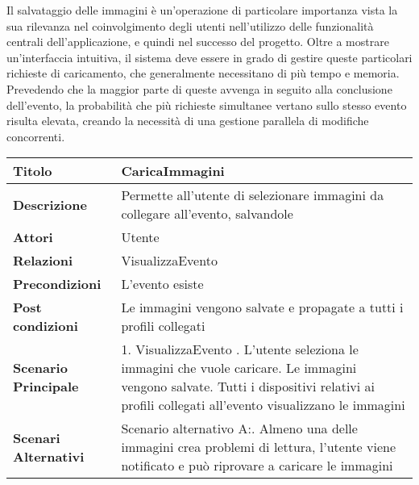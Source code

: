 Il salvataggio delle immagini è un'operazione di particolare importanza
vista la sua rilevanza nel coinvolgimento degli utenti
nell'utilizzo delle funzionalità centrali dell'applicazione,
e quindi nel successo del progetto.
Oltre a mostrare un'interfaccia intuitiva,
il sistema deve essere in grado di gestire queste particolari richieste di caricamento,
che generalmente necessitano di più tempo e memoria.
Prevedendo che la maggior parte di queste avvenga in seguito alla conclusione dell'evento,
la probabilità che più richieste simultanee vertano sullo stesso evento risulta elevata,
creando la necessità di una gestione parallela di modifiche concorrenti.\\

\begin{longtable} {|P{4.5cm}|P{11cm}|}
    \hline
    \textbf{Titolo}                   & CaricaImmagini                                                                  \\
    \hline
    \textbf{Descrizione}              & Permette all'utente di selezionare immagini da collegare all'evento, salvandole \\
    \hline
    \textbf{Attori}                   & Utente                                                                          \\
    \hline
    \textbf{Relazioni}                & VisualizzaEvento                                                                \\
    \hline
    \textbf{Precondizioni}            & L'evento esiste                                                                 \\
    \hline
    \textbf{Post condizioni}          & Le immagini vengono salvate e propagate a tutti i profili collegati             \\
    \hline
    \textbf{Scenario Principale}      & 1. VisualizzaEvento . L'utente seleziona le immagini che vuole caricare. Le immagini vengono salvate. Tutti i dispositivi relativi ai profili collegati all'evento visualizzano le immagini                            \\
    \hline
    \textbf{Scenari Alternativi}      &
    Scenario alternativo A:. Almeno una delle immagini crea problemi di lettura,
    l'utente viene notificato e può riprovare a caricare le immagini\newline

\end{longtable}
